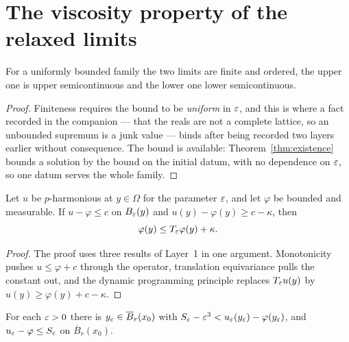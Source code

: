 \chapter{The viscosity property of the relaxed limits}

\begin{theorem}\label{thm:relaxed}
\leanok
{}
For a uniformly bounded family the two limits are finite and ordered, the
upper one is upper semicontinuous and the lower one lower semicontinuous.
\end{theorem}

\begin{proof}
\leanok
Finiteness requires the bound to be \emph{uniform} in $\varepsilon$, and this is
where a fact recorded in the companion --- that the reals are not a complete
lattice, so an unbounded supremum is a junk value --- binds after being
recorded two layers earlier without consequence. The bound is available:
Theorem~\ref{thm:existence} bounds a solution by the bound on the initial
datum, with no dependence on $\varepsilon$, so one datum serves the whole family.
\end{proof}


\begin{theorem}\label{thm:approxcmp}
\leanok
{}
Let $u$ be $p$-harmonious at $y \in \Omega$ for the parameter $\varepsilon$, and let
$\varphi$ be bounded and measurable. If $u - \varphi \le c$ on $B_\varepsilon(y)$ and
$u(y) - \varphi(y) \ge c - \kappa$, then
\[
  \varphi(y) \le T_\varepsilon\varphi(y) + \kappa .
\]
\end{theorem}

\begin{proof}
\leanok
{}
The proof uses three results of Layer~1 in one argument. Monotonicity pushes
$u \le \varphi + c$ through the operator, translation equivariance pulls the
constant out, and the dynamic programming principle replaces $T_\varepsilon u(y)$ by
$u(y) \ge \varphi(y) + c - \kappa$.
\end{proof}


\begin{theorem}\label{thm:nearsup}
\leanok
For each $\varepsilon > 0$ there is $y_\varepsilon \in \overline{B}_r(x_0)$ with
$S_\varepsilon - \varepsilon^3 < u_\varepsilon(y_\varepsilon) - \varphi(y_\varepsilon)$, and
$u_\varepsilon - \varphi \le S_\varepsilon$ on $\overline{B}_r(x_0)$.
\end{theorem}

